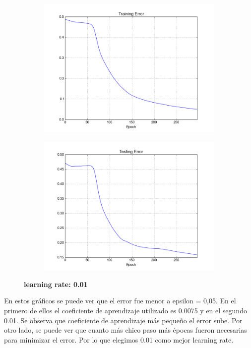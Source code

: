 \begin{figure}[h]	
	\begin{subfigure}[b]{0.5\textwidth}
		\includegraphics[width=\linewidth]{fig/trainingerror_lr0,01_eps0,05_regparam0,00_beta5_batch1.png}
	\end{subfigure}
	\begin{subfigure}[b]{0.5\textwidth}
		\includegraphics[width=\linewidth]{fig/valerror_lr0,01_eps0,05_regparam0,00_beta5_batch1.png}
	\end{subfigure}

	\caption{\textbf{learning rate: 0.01}}
\end{figure}

En estos gráficos se puede ver que el error fue menor a epsilon = 0,05.
 En el primero de ellos el coeficiente de aprendizaje utilizado es 
 0.0075 y en el segundo 0.01. Se observa que coeficiente de aprendizaje
  más pequeño el error sube. Por otro lado, se puede ver que cuanto 
  más chico paso más épocas fueron necesarias para minimizar el error. 
Por lo que elegimos 0.01 como mejor learning rate.

